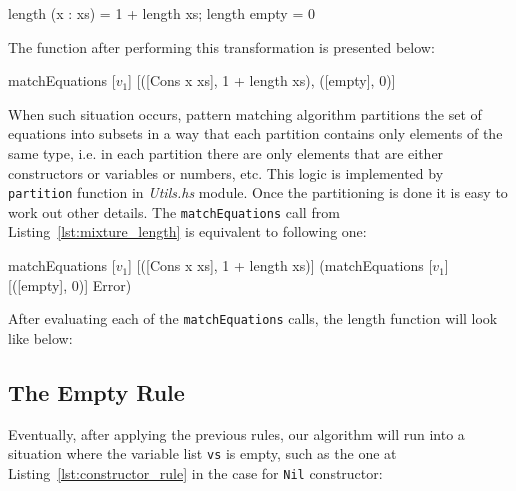 \documentclass[12pt,a4paper]{report}
\begin{document}
\vspace*{0.2in}
\begin{code}[style=haskell]
length (x : xs) = 1 + length xs;
length empty = 0
\end{code}

The function after performing this transformation is presented below:

\vspace*{0.2in}
\begin{code}[style=haskell,label=lst:mixture_length, mathescape=true,
  caption={Mixture rule application.}]
matchEquations [$v_{1}$]
               [([Cons x xs], 1 + length xs),
                ([empty], 0)]
\end{code}

When such situation occurs, pattern matching algorithm partitions the set of
equations into subsets in a way that each partition contains only elements of
the same type, i.e. in each partition there are only elements that are either
constructors or variables or numbers, etc. This logic is implemented by
\texttt{partition} function in \textit{Utils.hs} module. Once the partitioning
is done it is easy to work out other details. The \texttt{matchEquations} call
from Listing~\ref{lst:mixture_length} is equivalent to following one:

\vspace*{0.2in}
\begin{code}[style=haskell,mathescape=true]
matchEquations [$v_{1}$]
               [([Cons x xs], 1 + length xs)]
               (matchEquations [$v_{1}$]
                               [([empty], 0)]
                               Error)
\end{code}

After evaluating each of the \texttt{matchEquations} calls, the length function
will look like below:

\vspace*{0.2in}

\subsection{The Empty Rule}
Eventually, after applying the previous rules, our algorithm will run into a
situation where the variable list \texttt{vs} is empty, such as the one at
Listing~\ref{lst:constructor_rule} in the case for \texttt{Nil} constructor:
\end{document}

